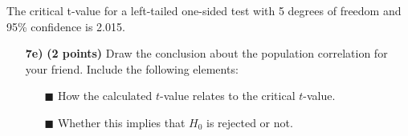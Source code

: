 The critical t-value for a left-tailed one-sided test with 5 degrees of freedom and 95\% confidence is 2.015.

\begin{itemize}

    \item[\textbf{7e)}] \textbf{(2 points)} Draw the conclusion about the population correlation for your friend. Include the following elements:
    \begin{itemize}
        \item[$\blacksquare$] How the calculated $t$-value relates to the critical $t$-value.
        \item[$\blacksquare$] Whether this implies that $H_0$ is rejected or not.
    \end{itemize}
    
\end{itemize}


\clearpage %